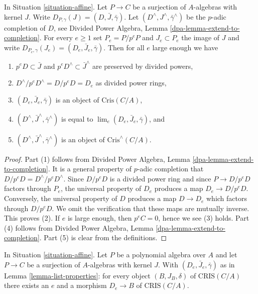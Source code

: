 \begin{lemma}
\label{lemma-list-properties}
In Situation \ref{situation-affine}.
Let $P \to C$ be a surjection of $A$-algebras with kernel $J$.
Write $D_{P, \gamma}(J) = (D, \bar J, \bar\gamma)$.
Let $(D^\wedge, J^\wedge, \bar\gamma^\wedge)$ be the
$p$-adic completion of $D$, see
Divided Power Algebra, Lemma \ref{dpa-lemma-extend-to-completion}.
For every $e \geq 1$ set $P_e = P/p^eP$ and $J_e \subset P_e$
the image of $J$ and write
$D_{P_e, \gamma}(J_e) = (D_e, \bar J_e, \bar\gamma)$.
Then for all $e$ large enough we have
\begin{enumerate}
\item $p^eD \subset \bar J$ and $p^eD^\wedge \subset \bar J^\wedge$
are preserved by divided powers,
\item $D^\wedge/p^eD^\wedge = D/p^eD = D_e$ as divided power rings,
\item $(D_e, \bar J_e, \bar\gamma)$ is an object of $\text{Cris}(C/A)$,
\item $(D^\wedge, \bar J^\wedge, \bar\gamma^\wedge)$ is equal to
$\lim_e (D_e, \bar J_e, \bar\gamma)$, and
\item $(D^\wedge, \bar J^\wedge, \bar\gamma^\wedge)$ is an object of
$\text{Cris}^\wedge(C/A)$.
\end{enumerate}
\end{lemma}

\begin{proof}
Part (1) follows from
Divided Power Algebra, Lemma \ref{dpa-lemma-extend-to-completion}.
It is a general property of $p$-adic completion that
$D/p^eD = D^\wedge/p^eD^\wedge$. Since $D/p^eD$ is a divided power ring
and since $P \to D/p^eD$ factors through $P_e$, the universal property of
$D_e$ produces a map $D_e \to D/p^eD$. Conversely, the universal property
of $D$ produces a map $D \to D_e$ which factors through $D/p^eD$. We omit
the verification that these maps are mutually inverse. This proves (2).
If $e$ is large enough, then $p^eC = 0$, hence we see (3) holds.
Part (4) follows from
Divided Power Algebra, Lemma \ref{dpa-lemma-extend-to-completion}.
Part (5) is clear from the definitions.
\end{proof}

\begin{lemma}
\label{lemma-set-generators}
In Situation \ref{situation-affine}.
Let $P$ be a polynomial algebra over $A$ and let
$P \to C$ be a surjection of $A$-algebras with kernel $J$.
With $(D_e, \bar J_e, \bar\gamma)$ as in Lemma \ref{lemma-list-properties}:
for every object $(B, J_B, \delta)$ of $\text{CRIS}(C/A)$ there
exists an $e$ and a morphism $D_e \to B$ of $\text{CRIS}(C/A)$.
\end{lemma}

